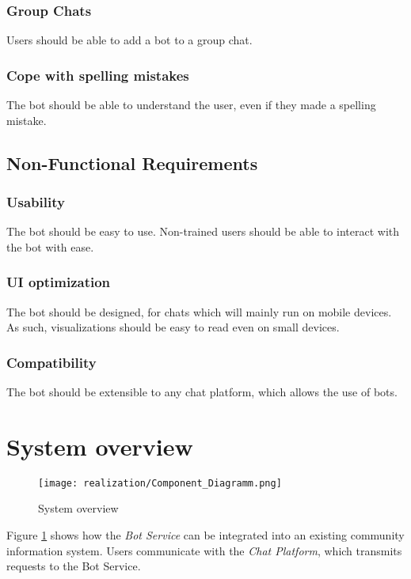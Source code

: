 \subsubsection{Group Chats} Users should be able to add a bot to a group chat.

\subsubsection{Cope with spelling mistakes} The bot should be able to understand the user, even if they made a spelling mistake.

\subsection{Non-Functional Requirements}

\subsubsection{Usability} The bot should be easy to use. Non-trained users should be able to interact with the bot with ease.

\subsubsection{UI optimization} The bot should be designed, for chats which will mainly run on mobile devices. As such, visualizations should be easy to read even on small devices.

\subsubsection{Compatibility} The bot should be extensible to any chat platform, which allows the use of bots.

\section{System overview}


\begin{figure}[h]
    \centering
    \texttt{[image: realization/Component\_Diagramm.png]}
    \caption{System overview}
    \label{fig:sytsemOverview}
\end{figure}

Figure \ref{fig:sytsemOverview} shows how the \emph{Bot Service} can be integrated into an existing community information system. Users communicate with the \emph{Chat Platform}, which transmits requests to the Bot Service.

